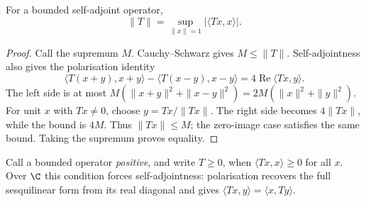 \begin{lemma}\label{lem:sanorm}
For a bounded self-adjoint operator,
\[
\|T\|=\sup_{\|x\|=1}|\langle Tx,x\rangle|.
\]
\end{lemma}
\begin{proof}
Call the supremum $M$. Cauchy--Schwarz gives $M\le\|T\|$. Self-adjointness also gives the polarisation identity
\[
\langle T(x+y),x+y\rangle-\langle T(x-y),x-y\rangle
=4\operatorname{Re}\langle Tx,y\rangle.
\]
The left side is at most $M(\|x+y\|^2+\|x-y\|^2)=2M(\|x\|^2+\|y\|^2)$. For unit $x$ with $Tx\ne0$, choose $y=Tx/\|Tx\|$. The right side becomes $4\|Tx\|$, while the bound is $4M$. Thus $\|Tx\|\le M$; the zero-image case satisfies the same bound. Taking the supremum proves equality.
\end{proof}

Call a bounded operator \emph{positive}, and write $T\ge0$, when $\langle Tx,x\rangle\ge0$ for all $x$. Over $\C$ this condition forces self-adjointness: polarisation recovers the full sesquilinear form from its real diagonal and gives $\langle Tx,y\rangle=\langle x,Ty\rangle$.

